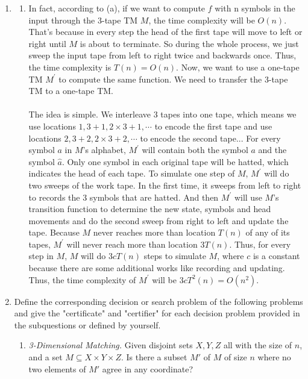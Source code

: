 \documentclass[12pt,a4paper]{article}
\makeatletter
\newtheorem*{solution}{Solution}
\theoremstyle{definition}
\renewenvironment{solution}[1][Solution] {\par\pushQED{\qed}\normalfont\topsep6\p@\@plus6\p@\relax\trivlist\item[\hskip\labelsep\bfseries#1\@addpunct{.}]\ignorespaces}{\popQED\endtrivlist\@endpefalse} \makeatother
\makeatother
\begin{document}
\begin{enumerate}
\begin{solution}
\begin{enumerate}
	    \item
	    In fact, according to (a), if we want to compute $f$ with n symbols in the input through the 3-tape TM $M$, the time complexity will be $O(n)$. That's because in every step the head of the first tape will move to left or right until $M$ is about to terminate. So during the whole process, we just sweep the input tape from left to right twice and backwards once. Thus, the time complexity is $T(n)=O(n)$. Now, we want to use a one-tape TM $M^{'}$ to compute the same function. We need to transfer the 3-tape TM to a one-tape TM.\\
	    ~\\
	    The idea is simple. We interleave 3 tapes into one tape, which means we use locations $1,3+1,2\times 3+1,\cdots$ to encode the first tape and use locations $2,3+2,2\times 3+2,\cdots$ to encode the second tape... For every symbol $a$ in $M$'s alphabet, $M^{'}$ will contain both the symbol $a$ and the symbol $\hat{a}$. Only one symbol in each original tape will be hatted, which indicates the head of each tape. To simulate one step of $M$, $M^{'}$ will do two sweeps of the work tape. In the first time, it sweeps from left to right to records the 3 symbols that are hatted. And then $M^{'}$ will use $M$'s transition function to determine the new state, symbols and head movements and do the second sweep from right to left and update the tape. Because $M$ never reaches more than location $T(n)$ of any of its tapes, $M^{'}$ will never reach more than location $3T(n)$. Thus, for every step in $M$, $M$ will do $3c T(n)$ steps to simulate $M$, where $c$ is a constant because there are some additional works like recording and updating. Thus, the time complexity of $M^{'}$ will be $3c T^2(n)=O(n^2)$.
	\end{enumerate}
	\end{solution}
	
	\newpage
	\item Define the corresponding decision or search problem of the following problems and give the "certificate" and "certifier" for each decision problem provided in the subquestions or defined by yourself.
	
	\begin{enumerate}
	    \item
	    \textit{3-Dimensional Matching.}  Given disjoint sets $X,Y,Z$ all with the size of $n$, and a set $M \subseteq X\times Y\times Z$.  Is there a subset $M'$ of $M$ of size $n$ where no two elements of $M'$ agree in any coordinate?
	    

\end{enumerate}
\end{enumerate}
\end{document}

